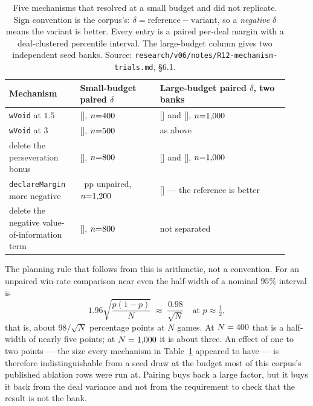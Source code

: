 \begin{table}[ht]
\centering
\caption{Five mechanisms that resolved at a small budget and did not replicate.
Sign convention is the corpus's: $\delta = \text{reference} - \text{variant}$, so
a \emph{negative} $\delta$ means the variant is better. Every entry is a paired
per-deal margin with a deal-clustered percentile interval. The large-budget
column gives two independent seed banks. Source:
\texttt{research/v06/notes/R12-mechanism-trials.md}, \S6.1.}
\label{tab:resolution}
\footnotesize
\begin{tabular}{@{}>{\raggedright\arraybackslash}p{0.235\linewidth}>{\raggedright\arraybackslash}p{0.265\linewidth}>{\raggedright\arraybackslash}p{0.42\linewidth}@{}}
\toprule
Mechanism & Small-budget paired $\delta$ & Large-budget paired $\delta$, two banks \\
\midrule
\texttt{wVoid} at $1.5$
  & \numResVoidSmall{} [\numResVoidSmallCI{}], $n{=}400{}$
  & \numResVoidLargeA{} [\numResVoidLargeACI{}] and
    \numResVoidLargeB{} [\numResVoidLargeBCI{}], $n{=}1{,}000{}$ \\
\addlinespace
\texttt{wVoid} at $3$
  & \numResVoidThreeSmall{} [\numResVoidThreeSmallCI{}], $n{=}500{}$
  & as above \\
\addlinespace
delete the perseveration bonus
  & \numResPerseverSmall{} [\numResPerseverSmallCI{}], $n{=}800{}$
  & \numResPerseverLargeA{} [\numResPerseverLargeACI{}] and
    \numResPerseverLargeB{} [\numResPerseverLargeBCI{}], $n{=}1{,}000{}$ \\
\addlinespace
\texttt{declareMargin} more negative
  & \numResDeclSmall{}~pp unpaired, $n{=}1{,}200{}$
  & \numResDeclLarge{} [\numResDeclLargeCI{}] --- the reference is better \\
\addlinespace
delete the negative value-of-information term
  & \numResVoiSmall{} [\numResVoiSmallCI{}], $n{=}800{}$
  & not separated \\
\bottomrule
\end{tabular}
\end{table}

The planning rule that follows from this is arithmetic, not a convention. For an
unpaired win-rate comparison near even the half-width of a nominal $95\%$
interval is
\begin{equation}
  1.96\sqrt{\frac{p(1-p)}{N}} \;\approx\; \frac{0.98}{\sqrt{N}}
  \quad\text{at } p \approx \tfrac12 ,
  \label{eq:halfwidth}
\end{equation}
that is, about $98/\sqrt{N}$ percentage points at $N$ games. At $N = 400{}$ that is a
half-width of nearly five points; at $N = 1{,}000{}$ it is about
three. An effect
of one to two points --- the size every mechanism in Table~\ref{tab:resolution}
appeared to have --- is therefore indistinguishable from a seed draw at the
budget most of this corpus's published ablation rows were run at. Pairing buys
back a large factor, but it buys it back from the deal variance and not from the
requirement to check that the result is not the bank.


